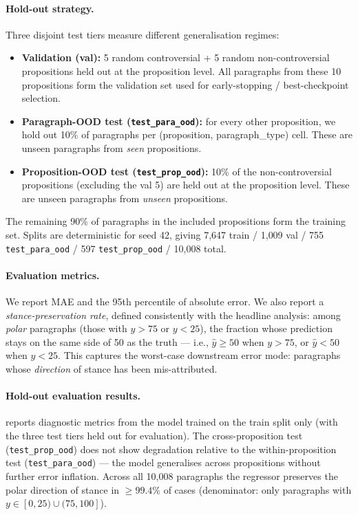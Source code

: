 \paragraph{Hold-out strategy.}
Three disjoint test tiers measure different generalisation regimes:
\begin{itemize}\setlength{\itemsep}{0pt}
  \item \textbf{Validation (val):} 5 random controversial + 5 random non-controversial propositions held out at the proposition level. All paragraphs from these 10 propositions form the validation set used for early-stopping / best-checkpoint selection.
  \item \textbf{Paragraph-OOD test (\texttt{test\_para\_ood}):} for every other proposition, we hold out 10\% of paragraphs per (proposition, paragraph\_type) cell. These are unseen paragraphs from \emph{seen} propositions.
  \item \textbf{Proposition-OOD test (\texttt{test\_prop\_ood}):} 10\% of the non-controversial propositions (excluding the val 5) are held out at the proposition level. These are unseen paragraphs from \emph{unseen} propositions.
\end{itemize}
The remaining 90\% of paragraphs in the included propositions form the training set. Splits are deterministic for seed 42, giving 7{,}647 train / 1{,}009 val / 755 \texttt{test\_para\_ood} / 597 \texttt{test\_prop\_ood} / 10{,}008 total.

\paragraph{Evaluation metrics.}
We report MAE and the 95th percentile of absolute error. We also report a \emph{stance-preservation rate}, defined consistently with the headline analysis: among \emph{polar} paragraphs (those with $y > 75$ or $y < 25$), the fraction whose prediction stays on the same side of 50 as the truth — i.e., $\hat{y} \geq 50$ when $y > 75$, or $\hat{y} < 50$ when $y < 25$. This captures the worst-case downstream error mode: paragraphs whose \emph{direction} of stance has been mis-attributed.

\paragraph{Hold-out evaluation results.}
 reports diagnostic metrics from the model trained on the train split only (with the three test tiers held out for evaluation). The cross-proposition test (\texttt{test\_prop\_ood}) does not show degradation relative to the within-proposition test (\texttt{test\_para\_ood}) — the model generalises across propositions without further error inflation. Across all 10{,}008 paragraphs the regressor preserves the polar direction of stance in $\geq 99.4\%$ of cases (denominator: only paragraphs with $y \in [0, 25) \cup (75, 100]$).

